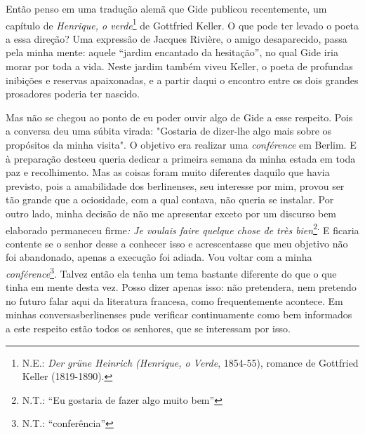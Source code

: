 Então penso em uma tradução alemã que Gide publicou recentemente, um
capítulo de \emph{Henrique, o verde}\footnote{N.E.: \emph{Der grüne
  Heinrich (Henrique, o Verde}, 1854-55), romance de Gottfried Keller
  (1819-1890).} de Gottfried Keller. O que pode ter levado o poeta a
essa direção? Uma expressão de Jacques Rivière, o amigo desaparecido,
passa pela minha mente: aquele ``jardim encantado da hesitação'', no
qual Gide iria morar por toda a vida. Neste jardim também viveu Keller,
o poeta de profundas inibições e reservas apaixonadas, e a partir daqui
o encontro entre os dois grandes prosadores poderia ter nascido.

Mas não se chegou ao ponto de eu poder ouvir algo de Gide a esse
respeito. Pois a conversa deu uma súbita virada: "Gostaria de dizer-lhe
algo mais sobre os propósitos da minha visita". O objetivo era realizar
uma \emph{conférence} em Berlim. E à preparação desteeu queria dedicar a
primeira semana da minha estada em toda paz e recolhimento. Mas as
coisas foram muito diferentes daquilo que havia previsto, pois a
amabilidade dos berlinenses, seu interesse por mim, provou ser tão
grande que a ociosidade, com a qual contava, não queria se instalar. Por
outro lado, minha decisão de não me apresentar exceto por um discurso
bem elaborado permaneceu firme\emph{: Je voulais faire quelque chose de
très bien}\footnote{N.T.: ``Eu gostaria de fazer algo muito bem''}\textsuperscript{.}
E ficaria contente se o senhor desse a conhecer isso e acrescentasse que
meu objetivo não foi abandonado, apenas a execução foi adiada. Vou
voltar com a minha \emph{conférence}\footnote{N.T.: ``conferência''}.
Talvez então ela tenha um tema bastante diferente do que o que tinha em
mente desta vez. Posso dizer apenas isso: não pretendera, nem pretendo
no futuro falar aqui da literatura francesa, como frequentemente
acontece. Em minhas conversasberlinenses pude verificar continuamente
como bem informados a este respeito estão todos os senhores, que se
interessam por isso.

